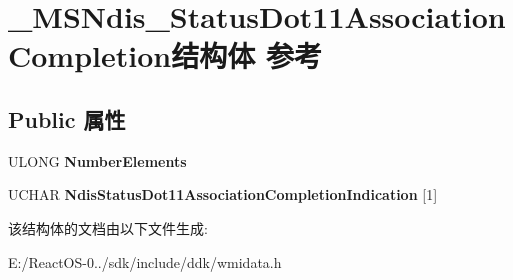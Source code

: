 \hypertarget{struct___m_s_ndis___status_dot11_association_completion}{}\section{\+\_\+\+M\+S\+Ndis\+\_\+\+Status\+Dot11\+Association\+Completion结构体 参考}
\label{struct___m_s_ndis___status_dot11_association_completion}
\subsection*{Public 属性}
\begin{DoxyCompactItemize}
\item 
\mbox{\label{struct___m_s_ndis___status_dot11_association_completion_af3509553602b4b1b6708753957da3d2a}} 
U\+L\+O\+NG {\bfseries Number\+Elements}
\item 
\mbox{\label{struct___m_s_ndis___status_dot11_association_completion_a2d1a9f1949e922cb65cb3b7c49f038b9}} 
U\+C\+H\+AR {\bfseries Ndis\+Status\+Dot11\+Association\+Completion\+Indication} \mbox{[}1\mbox{]}
\end{DoxyCompactItemize}


该结构体的文档由以下文件生成\+:\begin{DoxyCompactItemize}
\item 
E\+:/\+React\+O\+S-\/0../sdk/include/ddk/wmidata.\+h\end{DoxyCompactItemize}
